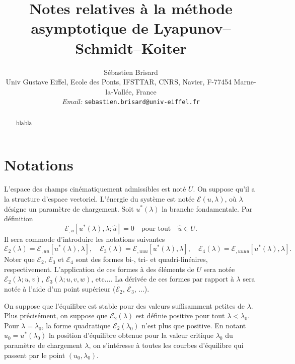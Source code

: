 \documentclass{article}
\newcommand{\nocomma}{}
\newcommand{\tmaffiliation}[1]{\\ #1}
\newcommand{\tmemail}[1]{\\ \textit{Email:} \texttt{#1}}
\begin{document}
\title{Notes relatives {\`a} la m{\'e}thode asymptotique de
Lyapunov--Schmidt--Koiter}

\author{
  S{\'e}bastien Brisard
  \tmaffiliation{Univ Gustave Eiffel, Ecole des Ponts, IFSTTAR, CNRS, Navier,
  F-77454 Marne-la-Vall{\'e}e, France}
  \tmemail{sebastien.brisard@univ-eiffel.fr}
}

\maketitle

\begin{abstract}
  blabla
\end{abstract}

\section{Notations}

L'espace des champs cin{\'e}matiquement admissibles est not{\'e} $U$. On
suppose qu'il a la structure d'espace vectoriel. L'{\'e}nergie du syst{\`e}me
est not{\'e}e $\mathcal{E} (u, \lambda)$, o{\`u} $\lambda$ d{\'e}signe un
param{\`e}tre de chargement. Soit $u^{\ast} (\lambda)$ la branche
fondamentale. Par d{\'e}finition
\begin{equation}
  \mathcal{E}_{, u} [u^{\ast} (\lambda), \lambda ; \hat{u}] = 0 \quad
  \text{pour tout} \quad \hat{u} \in U.
\end{equation}
Il sera commode d'introduire les notations suivantes
\begin{equation}
  \mathcal{E}_2 (\lambda) =\mathcal{E}_{, u \nocomma u}  [u^{\ast} (\lambda),
  \lambda], \quad \mathcal{E}_3 (\lambda) =\mathcal{E}_{, u \nocomma u
  \nocomma u} [u^{\ast} (\lambda), \lambda], \quad \mathcal{E}_4 (\lambda)
  =\mathcal{E}_{, u \nocomma u \nocomma u \nocomma u} [u^{\ast} (\lambda),
  \lambda] .
\end{equation}
Noter que $\mathcal{E}_2$, $\mathcal{E}_3$ et $\mathcal{E}_4$ sont des formes
bi-, tri- et quadri-lin{\'e}aires, respectivement. L'application de ces formes
{\`a} des {\'e}l{\'e}ments de $U$ sera not{\'e}e $\mathcal{E}_2 (\lambda ; u,
v)$, $\mathcal{E}_3 (\lambda ; u, v, w)$, etc.... La d{\'e}riv{\'e}e de ces
formes par rapport {\`a} $\lambda$ sera not{\'e}e {\`a} l'aide d'un point
sup{\'e}rieur ($\dot{\mathcal{E}_2}$, $\dot{\mathcal{E}_3}$, ...).

On suppose que l'{\'e}quilibre est stable pour des valeurs suffisamment
petites de $\lambda$. Plus pr{\'e}cis{\'e}ment, on suppose que $\mathcal{E}_2
(\lambda)$ est d{\'e}finie positive pour tout $\lambda < \lambda_0$. Pour
$\lambda = \lambda_0$, la forme quadratique $\mathcal{E}_2 (\lambda_0)$ n'est
plus que positive. En notant $u_0 = u^{\ast} (\lambda_0)$ la position
d'{\'e}quilibre obtenue pour la valeur critique $\lambda_0$ du param{\`e}tre
de chargement $\lambda$, on s'int{\'e}resse {\`a} toutes les courbes
d'{\'e}quilibre qui passent par le point $(u_0, \lambda_0)$.
\end{document}
